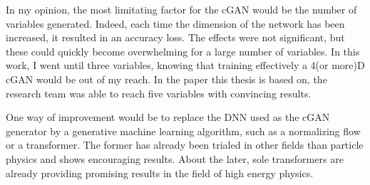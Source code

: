 In my opinion, the most limitating factor for the cGAN would be the number of variables generated. Indeed, each time the dimension of the network has been increased, it resulted in an accuracy loss. The effects were not significant, but these could quickly become overwhelming for a large number of variables. In this work, I went until three variables, knowing that training effectively a 4(or more)D cGAN would be out of my reach. In the paper this thesis is based on, the research team was able to reach five variables with convincing results. 

One way of improvement would be to replace the DNN used as the cGAN generator by a generative machine learning algorithm, such as a normalizing flow or a transformer. The former has already been trialed in other fields than particle physics and shows encouraging results. About the later, sole transformers are already providing promising results in the field of high energy physics.